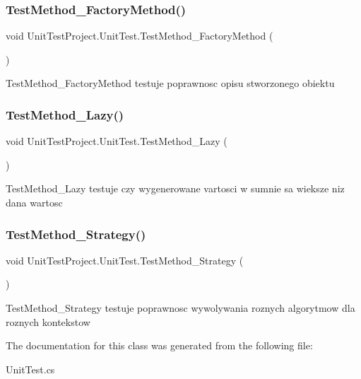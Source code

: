 \subsubsection{\texorpdfstring{Test\+Method\+\_\+\+Factory\+Method()}{TestMethod\_FactoryMethod()}}
{\footnotesize\ttfamily void Unit\+Test\+Project.\+Unit\+Test.\+Test\+Method\+\_\+\+Factory\+Method (\begin{DoxyParamCaption}{ }\end{DoxyParamCaption})}



Test\+Method\+\_\+\+Factory\+Method testuje poprawnosc opisu stworzonego obiektu 

\mbox{\label{class_unit_test_project_1_1_unit_test_ac45373676e49f296a2b6d36b820aaf84}} 
\subsubsection{\texorpdfstring{Test\+Method\+\_\+\+Lazy()}{TestMethod\_Lazy()}}
{\footnotesize\ttfamily void Unit\+Test\+Project.\+Unit\+Test.\+Test\+Method\+\_\+\+Lazy (\begin{DoxyParamCaption}{ }\end{DoxyParamCaption})}



Test\+Method\+\_\+\+Lazy testuje czy wygenerowane vartosci w sumnie sa wieksze niz dana wartosc 

\mbox{\label{class_unit_test_project_1_1_unit_test_ab43f4fd2163eb134a7857cd72edae296}} 
\subsubsection{\texorpdfstring{Test\+Method\+\_\+\+Strategy()}{TestMethod\_Strategy()}}
{\footnotesize\ttfamily void Unit\+Test\+Project.\+Unit\+Test.\+Test\+Method\+\_\+\+Strategy (\begin{DoxyParamCaption}{ }\end{DoxyParamCaption})}



Test\+Method\+\_\+\+Strategy testuje poprawnosc wywolywania roznych algorytmow dla roznych kontekstow 



The documentation for this class was generated from the following file\+:\begin{DoxyCompactItemize}
\item 
Unit\+Test.\+cs\end{DoxyCompactItemize}
